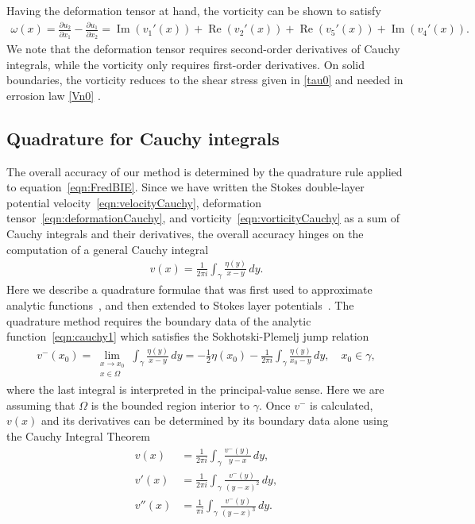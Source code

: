 \documentclass[3p]{elsarticle}
\renewcommand{\Re}{{\operatorname{Re}}}
\renewcommand{\Im}{{\operatorname{Im}}}
\newcommand{\pderiv}[2]{\frac{\partial #1}{\partial #2}}
\begin{document}
Having the deformation tensor at hand, the vorticity can be shown to
satisfy
\begin{align}
  \omega(x) = \pderiv{u_2}{x_1} - \pderiv{u_1}{x_2} = 
     \Im(v_1'(x)) + \Re(v_2'(x)) + \Re(v_5'(x)) + \Im(v_4'(x)).
  \label{eqn:vorticityCauchy}
\end{align}
We note that the deformation tensor requires second-order derivatives of
Cauchy integrals, while the vorticity only requires first-order
derivatives. On solid boundaries, the vorticity reduces to the shear stress given in \eqref{tau0} and needed in errosion law \eqref{Vn0} \cite{quaife2018boundary, chiu2020viscous}.

\subsection{Quadrature for Cauchy integrals}
The overall accuracy of our method is determined by the
quadrature rule applied to equation~\eqref{eqn:FredBIE}. Since we have
written the Stokes double-layer potential
velocity~\eqref{eqn:velocityCauchy}, deformation
tensor~\eqref{eqn:deformationCauchy}, and
vorticity~\eqref{eqn:vorticityCauchy} as a sum of Cauchy integrals and
their derivatives, the overall accuracy hinges on the computation of a general Cauchy integral
\begin{align}
  v(x) = \frac{1}{2\pi i} \int_{\gamma} \frac{\eta(y)}{x-y} \, dy.
  \label{eqn:cauchy1}
\end{align}
Here we describe a quadrature formulae that was first used to
approximate analytic functions~\cite{ioa-pap-per1991}, and then extended
to Stokes layer potentials~\cite{bar-wu-vee2015}. The quadrature method
requires the boundary data of the analytic function~\eqref{eqn:cauchy1}
which satisfies the Sokhotski-Plemelj jump relation
\begin{align}
  v^{-}(x_0) = \lim_{\substack{x \rightarrow x_0 \\ x \in \Omega}} \int_{\gamma}
    \frac{\eta(y)}{x-y}\, dy = -\frac{1}{2}\eta(x_0) - 
    \frac{1}{2\pi i} \int_{\gamma} \frac{\eta(y)}{x_0-y} \, dy,
    \quad x_0 \in \gamma,
    \label{eqn:SP}
\end{align}
where the last integral is interpreted in the principal-value sense.
Here we are assuming that $\Omega$ is the bounded region interior to
$\gamma$. Once $v^{-}$ is calculated, $v(x)$ and its derivatives can be
determined by its boundary data alone using the Cauchy Integral Theorem
\begin{subequations}
  \label{eqn:cauchy}
  \begin{alignat}{3}
  \label{eqn:cauchyv}
  v(x) &= \frac{1}{2\pi i}\int_{\gamma} 
    \frac{v^{-}(y)}{y-x} \,dy, \\
  v'(x) &= \frac{1}{2\pi i} \int_{\gamma}
    \frac{v^{-}(y)}{(y-x)^2} \, dy, \\
  v''(x) &= \frac{1}{\pi i} \int_{\gamma}
    \frac{v^{-}(y)}{(y-x)^3} \, dy.
  \end{alignat}
\end{subequations}
\end{document}
